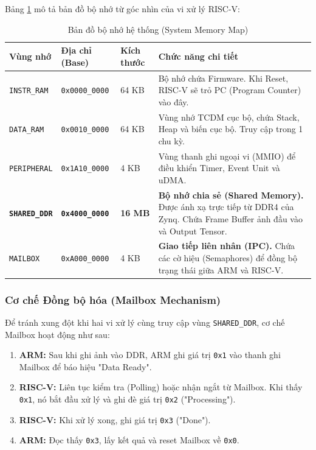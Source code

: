 Bảng \ref{tab:memory_map} mô tả bản đồ bộ nhớ từ góc nhìn của vi xử lý RISC-V:

\begin{table}[h]
\centering
\caption{Bản đồ bộ nhớ hệ thống (System Memory Map)}
\label{tab:memory_map}
\begin{tabular}{|l|l|l|p{5cm}|}
\hline
\textbf{Vùng nhớ} & \textbf{Địa chỉ (Base)} & \textbf{Kích thước} & \textbf{Chức năng chi tiết} \\ \hline
\texttt{INSTR\_RAM} & \texttt{0x0000\_0000} & 64 KB & Bộ nhớ chứa Firmware. Khi Reset, RISC-V sẽ trỏ PC (Program Counter) vào đây. \\ \hline
\texttt{DATA\_RAM} & \texttt{0x0010\_0000} & 64 KB & Vùng nhớ TCDM cục bộ, chứa Stack, Heap và biến cục bộ. Truy cập trong 1 chu kỳ. \\ \hline
\texttt{PERIPHERAL} & \texttt{0x1A10\_0000} & 4 KB & Vùng thanh ghi ngoại vi (MMIO) để điều khiển Timer, Event Unit và uDMA. \\ \hline
\textbf{\texttt{SHARED\_DDR}} & \textbf{\texttt{0x4000\_0000}} & \textbf{16 MB} & \textbf{Bộ nhớ chia sẻ (Shared Memory).} Được ánh xạ trực tiếp từ DDR4 của Zynq. Chứa Frame Buffer ảnh đầu vào và Output Tensor. \\ \hline
\texttt{MAILBOX} & \texttt{0xA000\_0000} & 4 KB & \textbf{Giao tiếp liên nhân (IPC).} Chứa các cờ hiệu (Semaphores) để đồng bộ trạng thái giữa ARM và RISC-V. \\ \hline
\end{tabular}
\end{table}

\subsubsection{Cơ chế Đồng bộ hóa (Mailbox Mechanism)}
Để tránh xung đột khi hai vi xử lý cùng truy cập vùng \texttt{SHARED\_DDR}, cơ chế Mailbox hoạt động như sau:
\begin{enumerate}
    \item \textbf{ARM:} Sau khi ghi ảnh vào DDR, ARM ghi giá trị \texttt{0x1} vào thanh ghi Mailbox để báo hiệu "Data Ready".
    \item \textbf{RISC-V:} Liên tục kiểm tra (Polling) hoặc nhận ngắt từ Mailbox. Khi thấy \texttt{0x1}, nó bắt đầu xử lý và ghi đè giá trị \texttt{0x2} ("Processing").
    \item \textbf{RISC-V:} Khi xử lý xong, ghi giá trị \texttt{0x3} ("Done").
    \item \textbf{ARM:} Đọc thấy \texttt{0x3}, lấy kết quả và reset Mailbox về \texttt{0x0}.
\end{enumerate}



